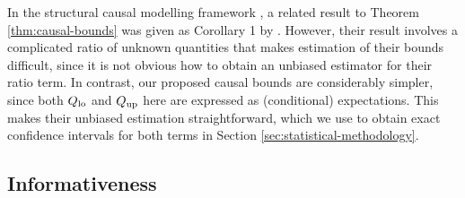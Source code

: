 

In the structural causal modelling framework \citep{pearl2009causality}, a related result to Theorem \ref{thm:causal-bounds} was given as Corollary 1 by \citet{bareinboim}.
However, their result involves a complicated ratio of unknown quantities that makes estimation of their bounds difficult, since it is not obvious how to obtain an unbiased estimator for their ratio term.
In contrast, our proposed causal bounds are considerably simpler, since both $Q_{\mathrm{lo}}$ and $Q_{\mathrm{up}}$ here are expressed as (conditional) expectations. 
This makes their unbiased estimation straightforward, which we use to obtain exact confidence intervals for both terms in Section \ref{sec:statistical-methodology}.





\subsection{Informativeness} \label{sec:informativeness-of-our-bounds}

